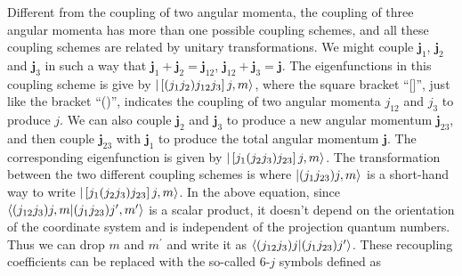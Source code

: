 Different from the coupling of two angular momenta, the coupling of three angular momenta has more than one possible
 coupling schemes, and all these coupling schemes are related by unitary transformations. We might couple $\mathbf{j}_{1}$, $\mathbf{j}_{2}$ and $\mathbf{j}_{3}$ in such a way that
  $\mathbf{j}_{1} + \mathbf{j}_{2}=\mathbf{j}_{12}$, $\mathbf{j}_{12} + \mathbf{j}_{3}= \mathbf{j}$. The eigenfunctions in this coupling scheme is give by $| \left[(j_1 j_2) j_{12} j_3\right] j, m \rangle$, where
  the square bracket ``[]'', just like the bracket ``()'',  indicates the coupling of two angular momenta $j_{12}$ and $j_3$ 
  to produce  $j$. We can also couple $\mathbf{j}_{2}$ and $\mathbf{j}_{3}$ to produce a new angular momentum 
  $\mathbf{j}_{23}$, and then couple $\mathbf{j}_{23}$ with  $\mathbf{j}_{1}$ to produce the total angular
   momentum  $\mathbf{j}$. The corresponding eigenfunction is given by $| \left[j_1(j_2 j_3) j_{23}\right] j, m \rangle$. 
The transformation between the two different coupling schemes is
where $|  (j_1 j_{23}) j, m  \rangle$ is a short-hand way to write  $| \left[j_1(j_2 j_3) j_{23}\right] j, m \rangle$.  In the above 
equation, since $\langle  (j_{12} j_3) j, m \allowbreak |  (j_1 j_{23}) j^{\prime}, m^{\prime}  \rangle$ is a scalar product, it 
doesn't depend on the orientation of the coordinate system and is independent of the projection quantum numbers. Thus we can drop $m$ and $m^{\prime}$ and write it as 
$\langle  (j_{12} j_3) j  |  (j_1 j_{23}) j^{\prime}  \rangle$. These recoupling coefficients can be replaced with the so-called
6-$j$ symbols defined as


  
  
